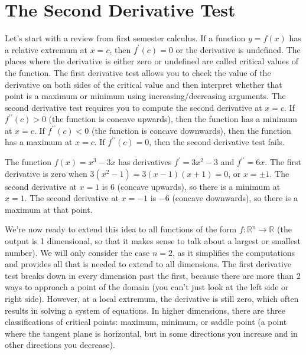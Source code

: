 \section{The Second Derivative Test}

Let's start with a review from first semester calculus. If a function $y=f(x)$ has a relative extremum at $x=c$, then $f^\prime(c)=0$ or the derivative is undefined. The places where the derivative is either zero or undefined are called critical values of the function. The first derivative test allows you to check the value of the derivative on both sides of the critical value and then interpret whether that point is a maximum or minimum using increasing/decreasing arguments.  The second derivative test requires you to compute the second derivative at $x=c$. If $f^{\prime\prime}(c)>0$ (the function is concave upwards), then the function has a minimum at $x=c$. If $f^{\prime\prime}(c)<0$ (the function is concave downwards), then the function has a maximum at $x=c$. If $f^{\prime\prime}(c)=0$, then the second derivative test fails. 

\begin{example}
The function $f(x) = x^3-3x$ has derivatives $f^\prime = 3x^2-3$ and $f^{\prime\prime}=6x$.  The first derivative is zero when $3(x^2-1)=3(x-1)(x+1)=0$, or $x=\pm 1$.  The second derivative at $x=1$ is $6$ (concave upwards), so there is a minimum at $x=1$.  The second derivative at $x=-1$ is $-6$ (concave downwards), so there is a maximum at that point. 
\end{example}

We're now ready to extend this idea to all functions of the form $f:{\mathbb{R}}^n\to{\mathbb{R}}$ (the output is 1 dimensional, so that it makes sense to talk about a largest or smallest number). We will only consider the case $n=2$, as it simplifies the computations and provides all that is needed to extend to all dimensions. The first derivative test breaks down in every dimension past the first, because there are more than 2 ways to approach a point of the domain (you can't just look at the left side or right side). However, at a local extremum, the derivative is still zero, which often results in solving a system of equations. In higher dimensions, there are three classifications of critical points: maximum, minimum, or saddle point (a point where the tangent plane is horizontal, but in some directions you increase and in other directions you decrease). 

